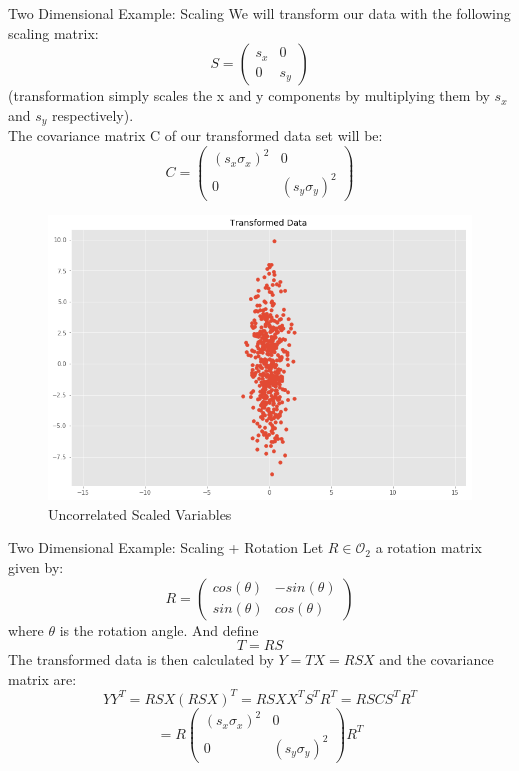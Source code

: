 \documentclass[11pt, usenames, dvipsnames]{beamer}
\begin{document}
\begin{frame}{Two Dimensional Example: Scaling}
We will transform our data with the following scaling matrix:
$$S = \left( \begin{array}{ccc}  s_x & 0 \\  0 & s_y \end{array} \right)$$
(transformation simply scales the x and y components by multiplying them by $s_x$ and $s_y$ respectively).\\
\pause
The covariance matrix C of our transformed data set will be:
$$C = \left( \begin{array}{ccc}  (s_x\sigma_x)^2 & 0 \\  0 & (s_y\sigma_y)^2 \end{array} \right)$$
\pause

\begin{figure}[h!]
  \centering
    \includegraphics[scale=0.2]{uncorrelated_scaled.png}  
   \caption{Uncorrelated Scaled Variables}
\end{figure}
\end{frame}
\endgroup
\begin{frame}{Two Dimensional Example: Scaling + Rotation}
    Let $R\in\mathcal{O}_2$ a rotation matrix given by:
$$R = \left( \begin{array}{ccc}  cos(\theta) & -sin(\theta) \\  sin(\theta) & cos(\theta) \end{array} \right)$$ where $\theta$ is the rotation angle. And define $$T = RS$$ 
\pause
The transformed data is then calculated by $Y=TX=RSX$ and the covariance matrix are:    $$YY^T=RSX(RSX)^T=RSXX^TS^TR^T=RSCS^TR^T$$
$$=R\left( \begin{array}{ccc}  (s_x\sigma_x)^2 & 0 \\  0 & (s_y\sigma_y)^2 \end{array} \right)R^T
$$
\end{frame}
\end{document}
